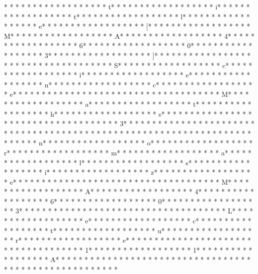 * * *  * * *  * * *  *  * * *  *  * * *  * t* * *  * * *  * * *  *  * * *  *  * * *  * i* * *  * * *  * * *  *  * * *  *  * * *  * t* * *  * * *  * * *  *  * * *  *  * * *  * l* * *  * * *  * * *  *  * * *  *  * * *  * e* * *  * * *  * * *  *  * * *  *  * * *  * [* * *  * * *  * * *  *  * * *  *  * * *  * M* * *  * * *  * * *  *  * * *  *  * * *  * A* * *  * * *  * * *  *  * * *  *  * * *  * 4* * *  * * *  * * *  *  * * *  *  * * *  * 6* * *  * * *  * * *  *  * * *  *  * * *  * 0* * *  * * *  * * *  *  * * *  *  * * *  * 3* * *  * * *  * * *  *  * * *  *  * * *  * ]* * *  * * *  * * *  *  * * *  *  * * *  * {* * *  * * *  * * *  *  * * *  *  * * *  * S* * *  * * *  * * *  *  * * *  *  * * *  * c* * *  * * *  * * *  *  * * *  *  * * *  * i* * *  * * *  * * *  *  * * *  *  * * *  * e* * *  * * *  * * *  *  * * *  *  * * *  * n* * *  * * *  * * *  *  * * *  *  * * *  * c* * *  * * *  * * *  *  * * *  *  * * *  * e* * *  * * *  * * *  *  * * *  *  * * *  *  * * *  * * *  * * *  *  * * *  *  * * *  * M* * *  * * *  * * *  *  * * *  *  * * *  * a* * *  * * *  * * *  *  * * *  *  * * *  * t* * *  * * *  * * *  *  * * *  *  * * *  * h* * *  * * *  * * *  *  * * *  *  * * *  * s* * *  * * *  * * *  *  * * *  *  * * *  *  * * *  * * *  * * *  *  * * *  *  * * *  * 3* * *  * * *  * * *  *  * * *  *  * * *  *  * * *  * * *  * * *  *  * * *  *  * * *  *  * * *  * * *  * * *  *  * * *  *  * * *  * {* * *  * * *  * * *  *  * * *  *  * * *  * n* * *  * * *  * * *  *  * * *  *  * * *  * o* * *  * * *  * * *  *  * * *  *  * * *  * r* * *  * * *  * * *  *  * * *  *  * * *  * m* * *  * * *  * * *  *  * * *  *  * * *  * a* * *  * * *  * * *  *  * * *  *  * * *  * l* * *  * * *  * * *  *  * * *  *  * * *  * s* * *  * * *  * * *  *  * * *  *  * * *  * i* * *  * * *  * * *  *  * * *  *  * * *  * z* * *  * * *  * * *  *  * * *  *  * * *  * e* * *  * * *  * * *  *  * * *  *  * * *  *  * * *  * * *  * * *  *  * * *  *  * * *  * M* * *  * * *  * * *  *  * * *  *  * * *  * A* * *  * * *  * * *  *  * * *  *  * * *  * 4* * *  * * *  * * *  *  * * *  *  * * *  * 6* * *  * * *  * * *  *  * * *  *  * * *  * 0* * *  * * *  * * *  *  * * *  *  * * *  * 3* * *  * * *  * * *  *  * * *  *  * * *  *  * * *  * * *  * * *  *  * * *  *  * * *  * L* * *  * * *  * * *  *  * * *  *  * * *  * e* * *  * * *  * * *  *  * * *  *  * * *  * c* * *  * * *  * * *  *  * * *  *  * * *  * t* * *  * * *  * * *  *  * * *  *  * * *  * u* * *  * * *  * * *  *  * * *  *  * * *  * r* * *  * * *  * * *  *  * * *  *  * * *  * e* * *  * * *  * * *  *  * * *  *  * * *  *  * * *  * * *  * * *  *  * * *  *  * * *  * 1* * *  * * *  * * *  *  * * *  *  * * *  * 1* * *  * * *  * * *  *  * * *  *  * * *  * A* * *  * * *  * * *  *  * * *  *  * * *  * }* * *  * * *  * * *  *  * * *  *  * * *  * }* * *  * * *  * * *  *  * * *  *  * * *  * 
